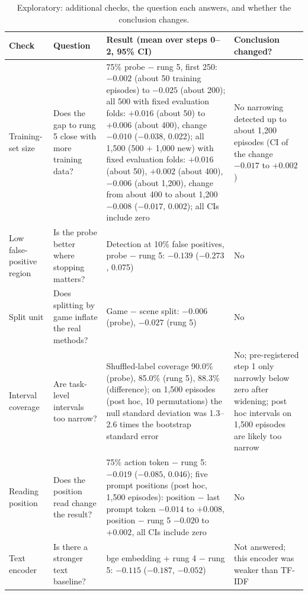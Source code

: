 \documentclass[11pt]{article}
\begin{document}
\begin{table}[t]
\centering\small
\caption{Exploratory: additional checks, the question each answers, and whether the conclusion changes.}\label{tab:extrasum}
\begin{tabularx}{\linewidth}{@{}lLLL@{}}
\toprule
Check & Question & Result (mean over steps 0--2, 95\% CI) & Conclusion changed? \\
\midrule
Training-set size & Does the gap to rung 5 close with more training data? & 75\% probe $-$ rung 5, first 250: $-0.002$ (about 50 training episodes) to $-0.025$ (about 200); all 500 with fixed evaluation folds: $+0.016$ (about 50) to $+0.006$ (about 400), change $-0.010$ ($-0.038$, 0.022); all 1,500 (500 + 1,000 new) with fixed evaluation folds: $+0.016$ (about 50), $+0.002$ (about 400), $-0.006$ (about 1,200), change from about 400 to about 1,200 $-0.008$ ($-0.017$, 0.002); all CIs include zero & No narrowing detected up to about 1,200 episodes (CI of the change $-0.017$ to $+0.002$) \\
Low false-positive region & Is the probe better where stopping matters? & Detection at 10\% false positives, probe $-$ rung 5: $-0.139$ ($-0.273$, 0.075) & No \\
Split unit & Does splitting by game inflate the real methods? & Game $-$ scene split: $-0.006$ (probe), $-0.027$ (rung 5) & No \\
Interval coverage & Are task-level intervals too narrow? & Shuffled-label coverage 90.0\% (probe), 85.0\% (rung 5), 88.3\% (difference); on 1,500 episodes (post hoc, 10 permutations) the null standard deviation was 1.3--2.6 times the bootstrap standard error & No; pre-registered step 1 only narrowly below zero after widening; post hoc intervals on 1,500 episodes are likely too narrow \\
Reading position & Does the position read change the result? & 75\% action token $-$ rung 5: $-0.019$ ($-0.085$, 0.046); five prompt positions (post hoc, 1,500 episodes): position $-$ last prompt token $-0.014$ to $+0.008$, position $-$ rung 5 $-0.020$ to $+0.002$, all CIs include zero & No \\
Text encoder & Is there a stronger text baseline? & bge embedding + rung 4 $-$ rung 5: $-0.115$ ($-0.187$, $-0.052$) & Not answered; this encoder was weaker than TF-IDF \\
\bottomrule
\end{tabularx}
\end{table}
\end{document}
